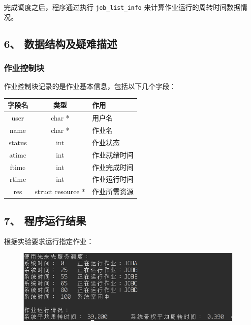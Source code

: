 \documentclass[12bp]{guo}
\begin{document}
完成调度之后，程序通过执行 \texttt{job_list_info}
来计算作业运行的周转时间数据情况。

\subsection{6、 数据结构及疑难描述}

\subsubsection{作业控制块}

作业控制块记录的是作业基本信息，包括以下几个字段：

\begin{table}[H]
    \centering
    \begin{tabular}{| c | c | l |}
        \hline
        字段名 & 类型 & 作用 \\ \hline
        user & char * & 用户名 \\
        name & char * & 作业名 \\
        status & int & 作业状态 \\
        atime & int & 作业就绪时间 \\
        ftime & int & 作业完成时间 \\
        rtime & int & 作业运行时间 \\
        res & struct resource * & 作业所需资源 \\ \hline
    \end{tabular}
\end{table}

\subsection{7、 程序运行结果}

根据实验要求运行指定作业：

\begin{figure}[h!]
    \centering
        \includegraphics[scale=0.75]{figures/2.result.png}
\end{figure}
\end{document}
